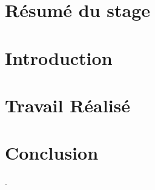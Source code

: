 \documentclass[a4paper, 12pt]{report}
\begin{document}
\begin{large}
\thispagestyle{empty}
\tableofcontents
\end{large}
\setcounter{page}{0}

\part{Résumé du stage}


\part{Introduction}




\part{Travail Réalisé}


\part{Conclusion}


\begin{large}
\thispagestyle{empty}
\listoffigures
\listoftables
.
\end{large}
\end{document}
